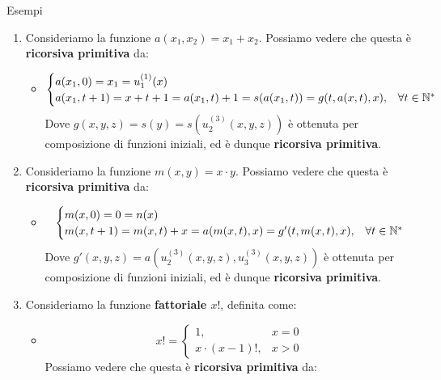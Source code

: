 \begin{generalbox}[colframe=azure-gradient-3!90!black]{Esempi}
  \begin{enumerate}
    \item Consideriamo la funzione \(a(x_1,x_2) = x_1+x_2\). Possiamo vedere che questa è \textbf{ricorsiva primitiva} da:
    \begin{itemize}
      \item []
      \begin{equation}
        \begin{cases}
          a(x_1,0)=x_1=u_1^{(1)}(x)\\
          a(x_1,t+1)=x+t+1=a(x_1,t)+1=s(a(x_1,t))=g(t, a(x,t),x), & \forall t \in \mathbb{N}^*
        \end{cases}
      \end{equation}
      Dove \(g(x,y,z)=s(y)=s(u_2^{(3)}(x,y,z))\) è ottenuta per composizione di funzioni iniziali, ed è dunque \textbf{ricorsiva primitiva}.
    \end{itemize}
    \item Consideriamo la funzione \(m(x,y)=x\cdot y\). Possiamo vedere che questa è \textbf{ricorsiva primitiva} da:
    \begin{itemize}
     \item []
      \begin{equation}
        \begin{cases}
          m(x,0)=0=n(x)\\
          m(x, t+1)=m(x, t)+x=a(m(x,t),x)=g'(t, m(x, t),x), & \forall t \in \mathbb{N}^*
        \end{cases}
      \end{equation}
      Dove \(g'(x,y,z)=a(u_2^{(3)}(x,y,z),u_3^{(3)}(x,y,z))\) è ottenuta per composizione di funzioni iniziali, ed è dunque \textbf{ricorsiva primitiva}.
    \end{itemize}
    \item Consideriamo la funzione \textbf{fattoriale \(x!\)}, definita come: %
    \begin{itemize}
      \item []
      \begin{equation}
        x! =\begin{cases}
              1, & x=0\\
              x\cdot (x-1)!,&  x>0
            \end{cases}
      \end{equation}
      Possiamo vedere che questa è \textbf{ricorsiva primitiva} da:
      \begin{equation}

\end{equation}
\end{itemize}
\end{enumerate}
\end{generalbox}
